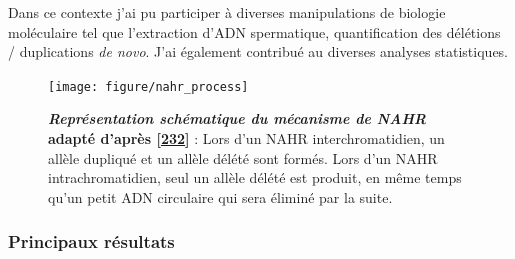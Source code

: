 \documentclass[12pt,a4paper,twoside]{ugathesis}
\theoremstyle{definition}
\theoremstyle{definition}
\theoremstyle{definition}
\theoremstyle{remark}
\begin{document}
Dans ce contexte j'ai pu participer à diverses manipulations de biologie
moléculaire tel que l'extraction d'ADN spermatique, quantification des
délétions / duplications \emph{de novo}. J'ai également contribué au
diverses analyses statistiques.

\newpage 

\begin{figure}

{\centering \texttt{[image: figure/nahr\_process]} 

}

\caption[Représentation schématique du mécanisme de NAHR]{\textbf{\emph{Représentation schématique du mécanisme de
NAHR} adapté d'après {[}\protect\hyperlink{ref-Liu2012}{232}{]}} : Lors
d'un NAHR interchromatidien, un allèle dupliqué et un allèle délété sont
formés. Lors d'un NAHR intrachromatidien, seul un allèle délété est
produit, en même temps qu'un petit ADN circulaire qui sera éliminé par
la suite.}\label{fig:pictnahr}
\end{figure}








\newpage



\newpage

\subsubsection{Principaux résultats}\label{principaux-resultats-5}
\end{document}
